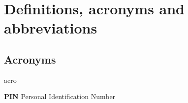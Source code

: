 \section{Definitions, acronyms and abbreviations}


\subsection{Acronyms}
	\begin{labeling}{acro}
		\item[\textbf{PIN}] Personal Identification Number
	\end{labeling}

